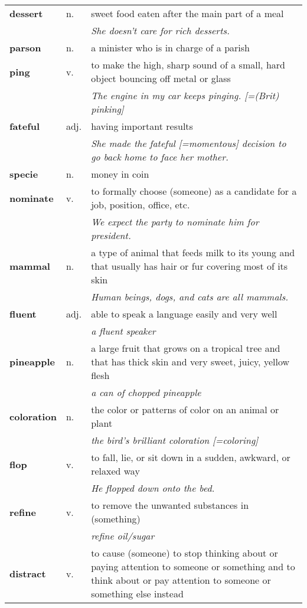 \documentclass[a4paper]{article}
\begin{document}
\begin{longtable}{llp{11cm}}
\textbf{dessert} & n. &  sweet food eaten after the main part of a meal \\
 & & \textit{She doesn't care for rich desserts.}\\[0.08cm]
\textbf{parson} & n. &  a minister who is in charge of a parish\\[0.08cm]
\textbf{ping} & v. &  to make the high, sharp sound of a small, hard object bouncing off metal or glass \\
 & & \textit{The engine in my car keeps pinging. [=(Brit) pinking]}\\[0.08cm]
\textbf{fateful} & adj. &  having important results \\
 & & \textit{She made the fateful [=momentous] decision to go back home to face her mother.}\\[0.08cm]
\textbf{specie} & n. &  money in coin\\[0.08cm]
\textbf{nominate} & v. &  to formally choose (someone) as a candidate for a job, position, office, etc. \\
 & & \textit{We expect the party to nominate him for president.}\\[0.08cm]
\textbf{mammal} & n. &  a type of animal that feeds milk to its young and that usually has hair or fur covering most of its skin \\
 & & \textit{Human beings, dogs, and cats are all mammals.}\\[0.08cm]
\textbf{fluent} & adj. &  able to speak a language easily and very well \\
 & & \textit{a fluent speaker}\\[0.08cm]
\textbf{pineapple} & n. &  a large fruit that grows on a tropical tree and that has thick skin and very sweet, juicy, yellow flesh \\
 & & \textit{a can of chopped pineapple}\\[0.08cm]
\textbf{coloration} & n. &  the color or patterns of color on an animal or plant \\
 & & \textit{the bird's brilliant coloration [=coloring]}\\[0.08cm]
\textbf{flop} & v. &  to fall, lie, or sit down in a sudden, awkward, or relaxed way \\
 & & \textit{He flopped down onto the bed.}\\[0.08cm]
\textbf{refine} & v. &  to remove the unwanted substances in (something) \\
 & & \textit{refine oil/sugar}\\[0.08cm]
\textbf{distract} & v. &  to cause (someone) to stop thinking about or paying attention to someone or something and to think about or pay attention to someone or something else instead \\

\end{longtable}
\end{document}
